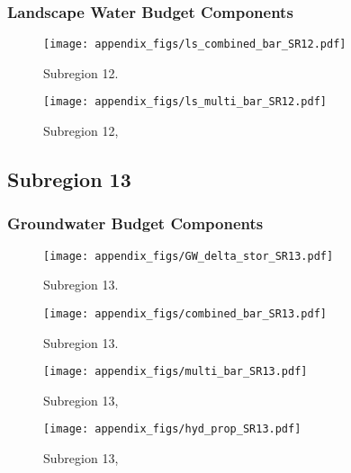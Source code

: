 \subsubsection{Landscape Water Budget Components}
\begin{figure}[ht]
\centerline{\texttt{[image: appendix\_figs/ls\_combined\_bar\_SR12.pdf]}}
\caption{\LSCombinedTextOne Subregion 12.\LSCombinedTextTwo}
\label{fig:LS_budget_SR12}
\end{figure}
\newpage

\begin{landscape}
\begin{figure}[ht]
\centerline{\texttt{[image: appendix\_figs/ls\_multi\_bar\_SR12.pdf]}}
\caption{\LSMultiTextOne Subregion 12,\LSMultiTextTwo}
\label{fig:multi_LS_budget_SR12}
\end{figure}
\newpage
\end{landscape}

\subsection{Subregion 13}
\subsubsection{Groundwater Budget Components}
\begin{figure}[h]
\centerline{\texttt{[image: appendix\_figs/GW\_delta\_stor\_SR13.pdf]}}
\caption{\GWBudgetText Subregion 13.}
\label{fig:delta_stor_SR13}
\end{figure}
\newpage

\begin{figure}[ht]
\centerline{\texttt{[image: appendix\_figs/combined\_bar\_SR13.pdf]}}
\caption{\GWCombinedTextOne Subregion 13.\GWCombinedTextTwo}
\label{fig:GW_budget_SR13}
\end{figure}
\newpage

\begin{landscape}
\begin{figure}[ht]
\centerline{\texttt{[image: appendix\_figs/multi\_bar\_SR13.pdf]}}
\caption{\GWMultiTextOne Subregion 13,\GWMultiTextTwo}
\label{fig:multi_GW_budget_SR13}
\end{figure}
\newpage

\begin{figure}[ht]
\centerline{\texttt{[image: appendix\_figs/hyd\_prop\_SR13.pdf]}}
\caption{\HydPropOne Subregion 13,\HydPropTwo}
\label{fig:hyd_prop_SR13}
\end{figure}
\newpage
\end{landscape}

